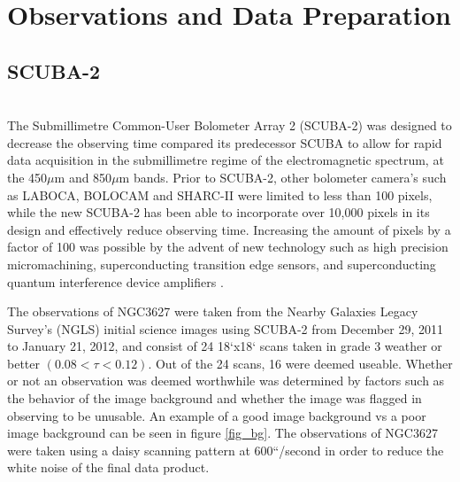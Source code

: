 

\chapter{Observations and Data Preparation}\label{observations}

\section{SCUBA-2} \\
The Submillimetre Common-User Bolometer Array 2 (SCUBA-2) was designed to decrease the observing time compared its predecessor SCUBA to allow for rapid data acquisition in the submillimetre regime of the electromagnetic spectrum, at the 450$\mu$m and 850$\mu$m bands.  Prior to SCUBA-2, other bolometer camera's such as LABOCA, BOLOCAM and SHARC-II were limited to less than 100 pixels, while the new SCUBA-2 has been able to incorporate over 10,000 pixels in its design and effectively reduce observing time.  Increasing the amount of pixels by a factor of 100 was possible by the advent of new technology such as high precision micromachining, superconducting transition edge sensors, and superconducting quantum interference device amplifiers \citet{holland2013}.

The observations of NGC3627 were taken from the Nearby Galaxies Legacy Survey's (NGLS) initial science images using SCUBA-2 from December 29, 2011  to January 21, 2012, and consist of 24 18`x18` scans taken in grade 3 weather or better $(0.08 < \tau <0.12)$.  Out of the 24 scans, 16 were deemed useable.  Whether or not an observation was deemed worthwhile was determined by factors such as the behavior of the image background and whether the image was flagged in observing to be unusable.  An example of a good image background vs a poor image background can be seen in figure \ref{fig_bg}.  The observations of NGC3627 were taken using a daisy scanning pattern at 600``/second in order to reduce the white noise of the final data product.

